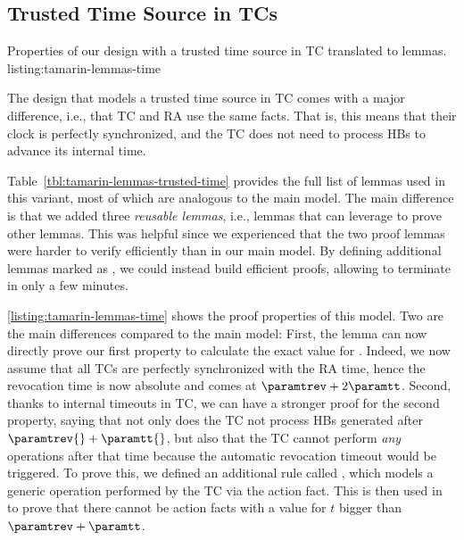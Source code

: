 \subsection{Trusted Time Source in TCs}



%
  {Properties of our design with a trusted time source in \ac{TC}
  translated to \tamarin{} lemmas.}%
  {listing:tamarin-lemmas-time} 

The design that models a trusted time source in \ac{TC} comes with a major
difference, i.e., that \ac{TC} and \ac{RA} use the same  facts.
That is, this means that their clock is perfectly synchronized, and the \ac{TC}
does not need to process \acp{HB} to advance its internal time.

Table~\ref{tbl:tamarin-lemmas-trusted-time} provides the full list of lemmas
used in this variant, most of which are analogous to the main model. The main
difference is that we added three \emph{reusable lemmas}, i.e., lemmas that
\tamarin{} can leverage to prove other lemmas. This was helpful since we
experienced that the two proof lemmas were harder to verify efficiently than in
our main model. By defining additional lemmas marked as , we
could instead build efficient proofs, allowing \tamarin{} to terminate in only a
few minutes.

\cref{listing:tamarin-lemmas-time} shows the proof properties of this model. Two
are the main differences compared to the main model: First, the
 lemma can now directly prove our first property
to calculate the exact value for \paramteff. Indeed, we now assume that all
\acp{TC} are perfectly synchronized with the \ac{RA} time, hence the revocation
time is now absolute and comes at $\paramtrev + 2\paramtt$. Second, thanks to
internal timeouts in \ac{TC}, we can have a stronger proof for the second
property, saying that not only does the \ac{TC} not process \acp{HB} generated
after $\paramtrev{} + \paramtt{}$, but also that the \ac{TC} cannot perform
\emph{any} operations after that time because the automatic revocation timeout
would be triggered. To prove this, we defined an additional rule called
, which models a generic operation performed by the
\ac{TC} via the  action fact. This is then used in
 to prove that there cannot be
 action facts with a value for $t$ bigger than
$\paramtrev + \paramtt$.
